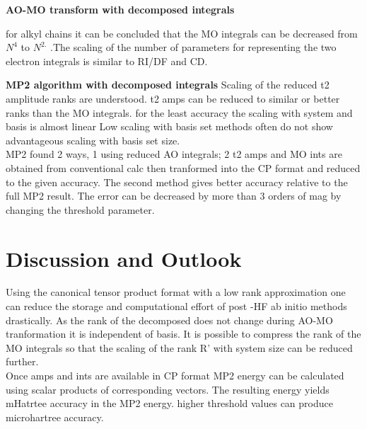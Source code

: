\documentclass[10pt, draft]{article}
\begin{document}
 \textbf{AO-MO transform with decomposed integrals} \linebreak[1]
 
 for alkyl chains it can be concluded that the MO integrals can be decreased from $N^4$ to $N^{2.}$ .The scaling of the number of parameters for representing the two electron integrals is similar to RI/DF and CD.  \linebreak[1]
 
 \textbf{MP2 algorithm with decomposed integrals}
 Scaling of the reduced t2 amplitude ranks are understood.  t2 amps can be reduced to similar or better ranks than the MO integrals.  for the least accuracy the scaling with system and basis is almost linear Low scaling with basis set methods often do not show advantageous scaling with basis set size.  \\
 MP2 found 2 ways, 1 using reduced AO integrals; 2 t2 amps and MO ints are obtained from conventional calc then tranformed into the CP format and reduced to the given accuracy.  The second method gives better accuracy relative to the full MP2 result.  The error can be decreased by more than 3 orders of mag by changing the threshold parameter.  
 
 \section{Discussion and Outlook}
 
 Using the canonical tensor product format with a low rank approximation one can reduce the storage and computational effort of post -HF ab initio methods drastically.  As the rank of the decomposed  does not change during AO-MO tranformation it is independent of basis.  It is possible to compress the rank of the MO integrals so that the scaling of the rank R' with system size can be reduced further.\\
 Once amps and ints are available in CP format MP2 energy can be calculated using scalar products of corresponding vectors.  The resulting energy yields mHatrtee accuracy in the MP2 energy.  higher threshold values can produce microhartree accuracy.  

 
\end{document}
